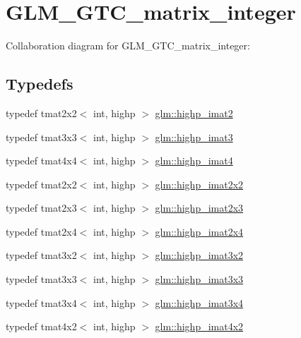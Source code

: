 \hypertarget{group__gtc__matrix__integer}{\section{G\-L\-M\-\_\-\-G\-T\-C\-\_\-matrix\-\_\-integer}
\label{group__gtc__matrix__integer}
}
Collaboration diagram for G\-L\-M\-\_\-\-G\-T\-C\-\_\-matrix\-\_\-integer\-:
\subsection*{Typedefs}
\begin{DoxyCompactItemize}
\item 
typedef tmat2x2$<$ int, highp $>$ \hyperlink{group__gtc__matrix__integer_gae1cd6ff099593d2f215bd4ceed538200}{glm\-::highp\-\_\-imat2}
\item 
typedef tmat3x3$<$ int, highp $>$ \hyperlink{group__gtc__matrix__integer_ga0766d11d0154f42893ef0912ab7c6a2c}{glm\-::highp\-\_\-imat3}
\item 
typedef tmat4x4$<$ int, highp $>$ \hyperlink{group__gtc__matrix__integer_gaa5eedcb20883541c3f7f2862cbd0b446}{glm\-::highp\-\_\-imat4}
\item 
typedef tmat2x2$<$ int, highp $>$ \hyperlink{group__gtc__matrix__integer_gab4411f2d106d24a32aaa3cb711dc8510}{glm\-::highp\-\_\-imat2x2}
\item 
typedef tmat2x3$<$ int, highp $>$ \hyperlink{group__gtc__matrix__integer_ga6c1a5f4d85de3f7eccb394970320bafc}{glm\-::highp\-\_\-imat2x3}
\item 
typedef tmat2x4$<$ int, highp $>$ \hyperlink{group__gtc__matrix__integer_gae7502957eb2ab9268726d87389ae2b55}{glm\-::highp\-\_\-imat2x4}
\item 
typedef tmat3x2$<$ int, highp $>$ \hyperlink{group__gtc__matrix__integer_ga2c8dc817124f44bc01f27777bfce983b}{glm\-::highp\-\_\-imat3x2}
\item 
typedef tmat3x3$<$ int, highp $>$ \hyperlink{group__gtc__matrix__integer_gaecb62c11fb25aadbb7eecc2da226d444}{glm\-::highp\-\_\-imat3x3}
\item 
typedef tmat3x4$<$ int, highp $>$ \hyperlink{group__gtc__matrix__integer_gabcd2d8d764b11db413259ee5cafd8446}{glm\-::highp\-\_\-imat3x4}
\item 
typedef tmat4x2$<$ int, highp $>$ \hyperlink{group__gtc__matrix__integer_ga7b936ac315e12b546d2597a4bffee4a1}{glm\-::highp\-\_\-imat4x2}
\item 

\end{DoxyCompactItemize}
